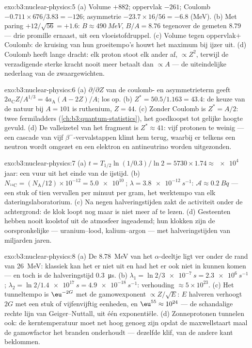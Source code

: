 \begin{solution}{exo:b3:nuclear-physics:5}
(a) Volume $+882$; oppervlak $-261$; Coulomb $-0.711\times676/3.83
= -126$; asymmetrie $-23.7\times16/56 = -6.8$ (\unit{MeV}). (b)
Met paring $+12/\sqrt{56} = +1.6$: $B \approx \qty{490}{MeV}$,
$B/A = 8.76$ tegenover de gemeten $8.79$ --- drie promille
ernaast, uit een vloeistofdruppel. (c) Volume tegen oppervlak$+$Coulomb: de
kruising van hun groeitempo's houwt het maximum bij ijzer uit.
(d) Coulomb heeft lange dracht: elk proton stoot elk ander af,
$\propto Z^2$, terwijl de verzadigende sterke kracht nooit meer betaalt dan
$\propto A$ --- de uiteindelijke nederlaag van de zwaargewichten.
\end{solution}

\begin{solution}{exo:b3:nuclear-physics:6}
(a) $\partial/\partial Z$ van de coulomb- en asymmetrieterm
geeft $2a_{\text{C}}Z/A^{1/3} = 4a_{\text{A}}(A - 2Z)/A$; los op.
(b) $Z^* = 50.5/1.163 = 43.4$: de keuze van de natuur bij $A = 101$ is
ruthenium, $Z = 44$. (c) Zonder Coulomb is $Z^* = A/2$: twee fermiladders
(\cref{ch:b3:quantum-statistics}), het goedkoopst tot
gelijke hoogte gevuld. (d) De valleizetel van het fragment is $Z^* \approx 41$:
vijf protonen te weinig --- een cascade van vijf $\beta^-$-vervalstappen klimt
hem terug, waarbij er telkens een neutron wordt omgezet en een elektron en
antineutrino worden uitgezonden.
\end{solution}

\begin{solution}{exo:b3:nuclear-physics:7}
(a) $t = T_{1/2}\ln(1/0.3)/\ln2 = 5730\times1.74 \approx
\qty{e4}{}$ jaar: een vuur uit het einde van de ijstijd. (b) $N_{^{14}\text{C}}
= (N_{\text{A}}/12)\times10^{-12} = \qty{5.0e10}{}$; $\lambda =
\qty{3.8e-12}{s^{-1}}$: $\mathcal A \approx \qty{0.2}{Bq}$ ---
een stuk of tien vervallen per minuut per gram, het werktempo van
elk dateringslaboratorium. (c) Na negen halveringstijden zakt de activiteit
onder de achtergrond: de klok loopt nog maar is niet meer
af te lezen. (d) Gesteenten hebben nooit koolstof uit de atmosfeer ingeademd; hun
klokken zijn de oorspronkelijke --- uranium--lood,
kalium--argon --- met halveringstijden van miljarden jaren.
\end{solution}

\begin{solution}{exo:b3:nuclear-physics:8}
(a) De \qty{8.78}{MeV} van het $\alpha$-deeltje ligt ver onder de rand van
\qty{26}{MeV}: klassiek kan het er niet uit en had het er ook niet in
kunnen komen --- en toch is de halveringstijd \qty{0.3}{\micro s}. (b)
$\lambda_1 = \ln2/\qty{3e-7}{s} = \qty{2.3e6}{s^{-1}}$;
$\lambda_2 = \ln2/\qty{1.4e17}{s} = \qty{4.9e-18}{s^{-1}}$:
verhouding $\approx 5\times10^{23}$. (c) Het tunneltempo is
$\eu^{-2G}$ met de gamowexponent $\propto Z/\sqrt E$:
$E$ halveren verhoogt $2G$ met een stuk of vijfenvijftig eenheden, en
$\eu^{55} \approx 10^{24}$ --- de schandalige rechte lijn van
Geiger--Nuttall, uit één exponentiële. (d) Zonneprotonen
tunnelen ook: de kerntemperatuur moet net hoog genoeg zijn opdat de
maxwellstaart maal de gamowfactor het branden onderhoudt ---
dezelfde klif, van de andere kant beklommen.
\end{solution}

